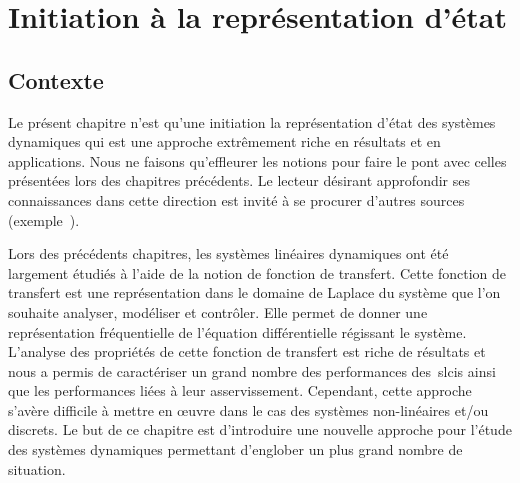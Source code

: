 \chapter[Représentation d'état]
{Initiation à la représentation d'état\label{chap-repreEtat}}
\minitoc
\newpage
\section{Contexte}
Le présent chapitre n'est qu'une initiation la représentation d'état des systèmes
dynamiques qui est une approche extrêmement riche
en résultats et en applications. Nous ne faisons qu'effleurer les notions pour
faire le pont avec celles présentées lors des chapitres précédents. 
Le lecteur désirant approfondir ses connaissances dans cette direction est 
invité à se procurer d'autres sources (exemple~\cite{Bachelier}). 

Lors des précédents chapitres, les systèmes linéaires dynamiques ont été 
largement étudiés à l'aide de la notion de fonction de transfert. Cette fonction
de transfert est une représentation dans le domaine de Laplace du système que
l'on souhaite analyser, modéliser et contrôler. Elle permet de donner
une représentation fréquentielle de l'équation différentielle régissant le 
système. L'analyse des propriétés de cette fonction de transfert est riche de
résultats et nous a permis de caractériser un grand nombre des performances
des~\glspl{slci} ainsi que les performances liées à leur asservissement. 
Cependant, cette approche s'avère difficile à mettre en œuvre dans le cas 
des systèmes non-linéaires et/ou discrets. Le but de ce chapitre est 
d'introduire une nouvelle approche  pour l'étude des systèmes dynamiques 
permettant d'englober un plus grand nombre de situation. 

